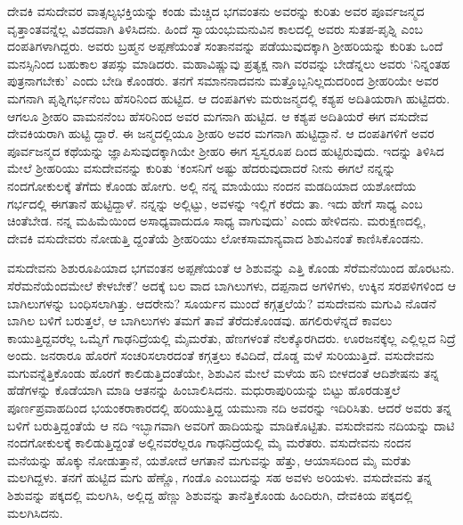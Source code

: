 ದೇವಕಿ ವಸುದೇವರ ವಾತ್ಸಲ್ಯಭಕ್ತಿಯನ್ನು ಕಂಡು ಮೆಚ್ಚಿದ ಭಗವಂತನು ಅವರನ್ನು ಕುರಿತು ಅವರ ಪೂರ್ವಜನ್ಮದ ವೃತ್ತಾಂತವನ್ನೆಲ್ಲ ವಿಶದವಾಗಿ ತಿಳಿಸಿದನು. ಹಿಂದೆ ಸ್ವಾಯಂಭುಮನುವಿನ ಕಾಲದಲ್ಲಿ ಅವರು ಸುತಪ-ಪೃಶ್ನಿ ಎಂಬ ದಂಪತಿಗಳಾಗಿದ್ದರು. ಅವರು ಬ್ರಹ್ಮನ ಅಪ್ಪಣೆಯಂತೆ ಸಂತಾನವನ್ನು ಪಡೆಯುವುದಕ್ಕಾಗಿ ಶ್ರೀಹರಿಯನ್ನು ಕುರಿತು ಒಂದೆ ಮನಸ್ಸಿನಿಂದ ಬಹುಕಾಲ ತಪಸ್ಸು ಮಾಡಿದರು. ಮಹಾವಿಷ್ಣುವು ಪ್ರತ್ಯಕ್ಷ ನಾಗಿ ವರವನ್ನು ಬೇಡೆನ್ನಲು ಅವರು ‘ನಿನ್ನಂತಹ ಪುತ್ರನಾಗಬೇಕು’ ಎಂದು ಬೇಡಿ ಕೊಂಡರು. ತನಗೆ ಸಮಾನನಾದವನು ಮತ್ತೊಬ್ಬನಿಲ್ಲದುದರಿಂದ ಶ್ರೀಹರಿಯೇ ಅವರ ಮಗನಾಗಿ ಪೃಶ್ನಿಗರ್ಭನೆಂಬ ಹೆಸರಿನಿಂದ ಹುಟ್ಟಿದ. ಆ ದಂಪತಿಗಳು ಮರುಜನ್ಮದಲ್ಲಿ ಕಶ್ಯಪ ಅದಿತಿಯರಾಗಿ ಹುಟ್ಟಿದರು. ಆಗಲೂ ಶ್ರೀಹರಿ ವಾಮನನೆಂಬ ಹೆಸರಿನಿಂದ ಅವರ ಮಗನಾಗಿ ಹುಟ್ಟಿದ. ಆ ಕಶ್ಯಪ ಅದಿತಿಯರೆ ಈಗ ವಸುದೇವ ದೇವಕಿಯರಾಗಿ ಹುಟ್ಟಿ ದ್ದಾರೆ. ಈ ಜನ್ಮದಲ್ಲಿಯೂ ಶ್ರೀಹರಿ ಅವರ ಮಗನಾಗಿ ಹುಟ್ಟಿದ್ದಾನೆ. ಆ ದಂಪತಿಗಳಿಗೆ ಅವರ ಪೂರ್ವಜನ್ಮದ ಕಥೆಯನ್ನು ಜ್ಞಾಪಿಸುವುದಕ್ಕಾಗಿಯೇ ಶ್ರೀಹರಿ ಈಗ ಸ್ವಸ್ವರೂಪ ದಿಂದ ಹುಟ್ಟಿರುವುದು. ಇದನ್ನು ತಿಳಿಸಿದ ಮೇಲೆ ಶ್ರೀಹರಿಯು ವಸುದೇವನನ್ನು ಕುರಿತು ‘ಕಂಸನಿಗೆ ಅಷ್ಟು ಹೆದರುವುದಾದರೆ ನೀನು ಈಗಲೆ ನನ್ನನ್ನು ನಂದಗೋಕುಲಕ್ಕೆ ತೆಗೆದು ಕೊಂಡು ಹೋಗು. ಅಲ್ಲಿ ನನ್ನ ಮಾಯೆಯು ನಂದನ ಮಡದಿಯಾದ ಯಶೋದೆಯ ಗರ್ಭದಲ್ಲಿ ಈಗತಾನೆ ಹುಟ್ಟಿದ್ದಾಳೆ. ನನ್ನನ್ನು ಅಲ್ಲಿಟ್ಟು, ಅವಳನ್ನು ಇಲ್ಲಿಗೆ ಕರೆದು ತಾ. ಇದು ಹೇಗೆ ಸಾಧ್ಯ ಎಂಬ ಚಿಂತೆಬೇಡ. ನನ್ನ ಮಹಿಮೆಯಿಂದ ಅಸಾಧ್ಯವಾದುದೂ ಸಾಧ್ಯ ವಾಗುವುದು’ ಎಂದು ಹೇಳಿದನು. ಮರುಕ್ಷಣದಲ್ಲಿ, ದೇವಕಿ ವಸುದೇವರು ನೋಡುತ್ತಿ ದ್ದಂತೆಯೆ ಶ್ರೀಹರಿಯು ಲೋಕಸಾಮಾನ್ಯವಾದ ಶಿಶುವಿನಂತೆ ಕಾಣಿಸಿಕೊಂಡನು.

ವಸುದೇವನು ಶಿಶುರೂಪಿಯಾದ ಭಗವಂತನ ಅಪ್ಪಣೆಯಂತೆ ಆ ಶಿಶುವನ್ನು ಎತ್ತಿ ಕೊಂಡು ಸೆರೆಮನೆಯಿಂದ ಹೊರಟನು. ಸೆರೆಮನೆಯೆಂದಮೇಲೆ ಕೇಳಬೇಕೆ? ಅದಕ್ಕೆ ಬಲ ವಾದ ಬಾಗಿಲುಗಳು, ದಪ್ಪನಾದ ಅಗಳಿಗಳು, ಉಕ್ಕಿನ ಸರಪಳಿಗಳಿಂದ ಆ ಬಾಗಿಲುಗಳನ್ನು ಬಂಧಿಸಲಾಗಿತ್ತು. ಆದರೇನು? ಸೂರ್ಯನ ಮುಂದೆ ಕಗ್ಗತ್ತಲೆಯೆ? ವಸುದೇವನು ಮಗುವಿ ನೊಡನೆ ಬಾಗಿಲ ಬಳಿಗೆ ಬರುತ್ತಲೆ, ಆ ಬಾಗಿಲುಗಳು ತಮಗೆ ತಾವೆ ತೆರೆದುಕೊಂಡವು. ಹಗಲಿರುಳೆನ್ನದೆ ಕಾವಲು ಕಾಯುತ್ತಿದ್ದವರೆಲ್ಲ ಒಮ್ಮೆಗೆ ಗಾಢನಿದ್ರೆಯಲ್ಲಿ ಮೈಮರೆತು, ಹೆಣಗಳಂತೆ ನೆಲಕ್ಕೊರಗಿದರು. ಊರಜನಕ್ಕೆಲ್ಲ ಎಲ್ಲಿಲ್ಲದ ನಿದ್ರೆ ಅಂದು. ಜನರಾರೂ ಹೊರಗೆ ಸಂಚರಿಸಲಾರದಂತೆ ಕಗ್ಗತ್ತಲು ಕವಿದಿದೆ, ದೊಡ್ಡ ಮಳೆ ಸುರಿಯುತ್ತಿದೆ. ವಸುದೇವನು ಮಗುವನ್ನೆತ್ತಿಕೊಂಡು ಹೊರಗೆ ಕಾಲಿಡುತ್ತಿದಂತೆಯೇ, ಶಿಶುವಿನ ಮೇಲೆ ಮಳೆಯ ಹನಿ ಬೀಳದಂತೆ ಆದಿಶೇಷನು ತನ್ನ ಹೆಡೆಗಳನ್ನು ಕೊಡೆಯಾಗಿ ಮಾಡಿ ಆತನನ್ನು ಹಿಂಬಾಲಿಸಿದನು. ಮಧುರಾಪುರಿಯನ್ನು ಬಿಟ್ಟು ಹೊರಡುತ್ತಲೆ ಪೂರ್ಣಪ್ರವಾಹದಿಂದ ಭಯಂಕರಾಕಾರದಲ್ಲಿ ಹರಿಯುತ್ತಿದ್ದ ಯಮುನಾ ನದಿ ಅವರನ್ನು ಇದಿರಿಸಿತು. ಆದರೆ ಅವರು ತನ್ನ ಬಳಿಗೆ ಬರುತ್ತಿದ್ದಂತೆಯೆ ಆ ನದಿ ಇಬ್ಭಾಗವಾಗಿ ಅವರಿಗೆ ಹಾದಿಯನ್ನು ಮಾಡಿಕೊಟ್ಟಿತು. ವಸುದೇವನು ನದಿಯನ್ನು ದಾಟಿ ನಂದಗೋಕುಲಕ್ಕೆ ಕಾಲಿಡುತ್ತಿದ್ದಂತೆ ಅಲ್ಲಿನವರೆಲ್ಲರೂ ಗಾಢನಿದ್ರೆಯಲ್ಲಿ ಮೈ ಮರೆತರು. ವಸುದೇವನು ನಂದನ ಮನೆಯನ್ನು ಹೊಕ್ಕು ನೋಡುತ್ತಾನೆ, ಯಶೋದೆ ಆಗತಾನೆ ಮಗುವನ್ನು ಹೆತ್ತು, ಆಯಾಸದಿಂದ ಮೈ ಮರೆತು ಮಲಗಿದ್ದಳು. ತನಗೆ ಹುಟ್ಟಿದ ಮಗು ಹೆಣ್ಣೊ, ಗಂಡೊ ಎಂಬುದನ್ನು ಸಹ ಅವಳು ಅರಿಯಳು. ವಸುದೇವನು ತನ್ನ ಶಿಶುವನ್ನು ಪಕ್ಕದಲ್ಲಿ ಮಲಗಿಸಿ, ಅಲ್ಲಿದ್ದ ಹೆಣ್ಣು ಶಿಶುವನ್ನು ತಾನೆತ್ತಿಕೊಂಡು ಹಿಂದಿರುಗಿ, ದೇವಕಿಯ ಪಕ್ಕದಲ್ಲಿ ಮಲಗಿಸಿದನು.

